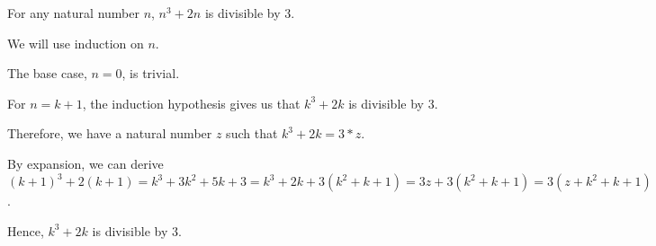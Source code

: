 For any natural number $n$, $n^3 + 2n$ is divisible by $3$.

We will use induction on $n$.

The base case, $n = 0$, is trivial.

For $n = k+1$, the induction hypothesis gives us that $k^3 + 2k$ is divisible by $3$.

Therefore, we have a natural number $z$ such that $k^3 + 2k = 3*z$.

By expansion, we can derive $(k+1)^3 + 2(k+1) = k^3 + 3k^2 + 5k + 3 = k^3 + 2k + 3(k^2 + k + 1) =3z + 3(k^2 + k + 1) = 3(z+k^2+k+1)$.

Hence, $k^3 + 2k$ is divisible by $3$.
